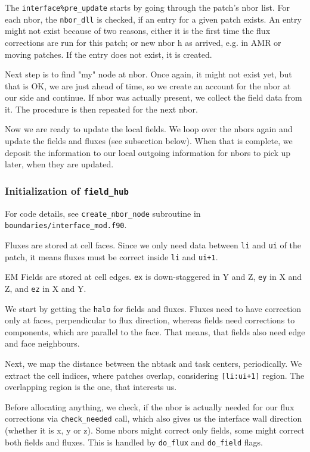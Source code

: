 \documentclass[paper=a4,fontsize=11pt]{scrartcl}
\numberwithin{equation}{section}		%
\numberwithin{figure}{section}			%
\numberwithin{table}{section}				%
\newcommand{\codecolor}{\color{Blue}}
\newcommand{\filecolor}{\color{NavyBlue}}
\newcommand{\File}[1]{{\filecolor\texttt{#1}}}
\newcommand{\Code}[1]{{\codecolor\texttt{#1}}}
\begin{document}
The \Code{interface\%pre\_update} starts by going through the patch's nbor list. For each nbor, the \Code{nbor\_dll} is checked, if an entry for a given patch exists. An entry might not exist because of two reasons, either it is the first time the flux corrections are run for this patch; or new nbor h  as arrived, e.g. in AMR or moving patches. If the entry does not exist, it is created.

Next step is to find "my" node at nbor. Once again, it might not exist yet, but that is OK, we are just ahead of time, so we create an account for the nbor at our side and continue. If nbor was actually present, we collect the field data from it. The procedure is then repeated for the next nbor.

Now we are ready to update the local fields. We loop over the nbors again and update the fields and fluxes (see subsection below). When that is complete, we deposit the information to our local outgoing information for nbors to pick up later, when they are updated.

\subsubsection{Initialization of \Code{field\_hub}}
For code details, see \Code{create\_nbor\_node} subroutine in \File{boundaries/interface\_mod.f90}.

Fluxes are stored at cell faces. Since we only need data between \Code{li} and \Code{ui} of the patch, it means fluxes must be correct inside \Code{li} and \Code{ui+1}. 

EM Fields are stored at cell edges. \Code{ex} is down-staggered in Y and Z, \Code{ey} in X and Z, and \Code{ez} in X and Y. 

We start by getting the \Code{halo} for fields and fluxes. Fluxes need to have correction only at faces, perpendicular to flux direction, whereas fields need corrections to components, which are parallel to the face. That means, that fields also need edge and face neighbours. 

Next, we map the distance between the nbtask and task centers, periodically. We extract the cell indices, where patches overlap, considering \Code{[li:ui+1]} region. The overlapping region is the one, that interests us.

Before allocating anything, we check, if the nbor is actually needed for our flux corrections via \Code{check\_needed} call, which also gives us the interface wall direction (whether it is x, y or z). Some nbors might correct only fields, some might correct both fields and fluxes. This is handled by \Code{do\_flux} and \Code{do\_field} flags. 
\end{document}
